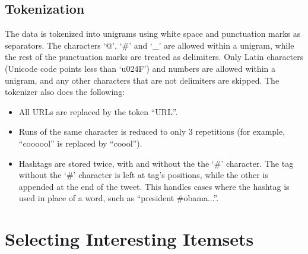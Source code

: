 \documentclass[letterpaper,12pt,titlepage,oneside,final]{book}
\begin{document}
\section{Tokenization}
The data is tokenized into unigrams using white space and punctuation marks as separators. 
The characters `@', `\#' and `\_' are allowed within a unigram, 
while the rest of the punctuation marks are treated as delimiters. %
Only Latin characters  (Unicode code points less than `u024F') and numbers are allowed within a unigram,
and any other characters that are not delimiters are skipped.
The tokenizer also does the following:
\begin{itemize}
\item All URLs are replaced by the token ``URL''. 
\item Runs of the same character is reduced to only 3 repetitions (for example, ``coooool'' is replaced by  ``coool''). 
\item Hashtags are stored twice, with and without the the `\#' character. 
The tag without the `\#' character is left at tag's positions, while the other is appended at the end of the tweet.
This handles cases where the hashtag is used in place of a word, such as ``president \#obama...''.
\end{itemize}




\chapter{Selecting Interesting Itemsets}
\label{sec:strong}
\end{document}
